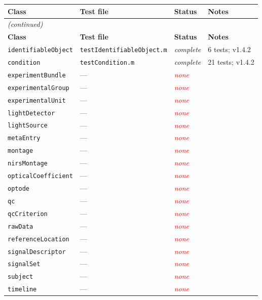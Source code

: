 \documentclass[11pt,a4paper]{article}
\newcommand{\statusNone}{\textcolor{red}{\textit{none}}}
\newcommand{\statusComplete}{\textcolor{green!60!black}{\textit{complete}}}
\begin{document}
\begin{longtable}{llll}
\toprule
\textbf{Class} & \textbf{Test file} & \textbf{Status} & \textbf{Notes} \\
\midrule
\endfirsthead
\multicolumn{4}{l}{\small\itshape (continued)} \\
\toprule
\textbf{Class} & \textbf{Test file} & \textbf{Status} & \textbf{Notes} \\
\midrule
\endhead
\bottomrule
\endfoot
\texttt{identifiableObject}  & \texttt{testIdentifiableObject.m} & \statusComplete & 6 tests; v1.4.2 \\
\texttt{condition}           & \texttt{testCondition.m}          & \statusComplete & 21 tests; v1.4.2 \\
\texttt{experimentBundle}    & ---                               & \statusNone & \\
\texttt{experimentalGroup}   & ---                               & \statusNone & \\
\texttt{experimentalUnit}    & ---                               & \statusNone & \\
\texttt{lightDetector}       & ---                               & \statusNone & \\
\texttt{lightSource}         & ---                               & \statusNone & \\
\texttt{metaEntry}           & ---                               & \statusNone & \\
\texttt{montage}             & ---                               & \statusNone & \\
\texttt{nirsMontage}         & ---                               & \statusNone & \\
\texttt{opticalCoefficient}  & ---                               & \statusNone & \\
\texttt{optode}              & ---                               & \statusNone & \\
\texttt{qc}                  & ---                               & \statusNone & \\
\texttt{qcCriterion}         & ---                               & \statusNone & \\
\texttt{rawData}             & ---                               & \statusNone & \\
\texttt{referenceLocation}   & ---                               & \statusNone & \\
\texttt{signalDescriptor}    & ---                               & \statusNone & \\
\texttt{signalSet}           & ---                               & \statusNone & \\
\texttt{subject}             & ---                               & \statusNone & \\
\texttt{timeline}            & ---                               & \statusNone & \\
\end{longtable}
\end{document}
